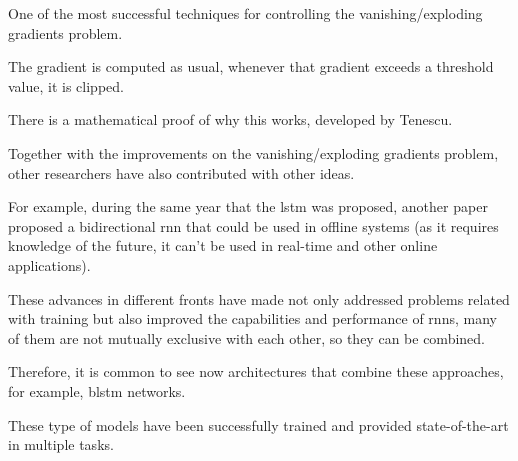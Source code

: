  One of the most successful techniques for
controlling the vanishing/exploding gradients problem.

The gradient is computed as usual, whenever that gradient
exceeds a threshold value, it is clipped.

There is a mathematical proof of why this works, developed
by Tenescu.

 Together with the improvements on
the vanishing/exploding gradients problem, other researchers
have also contributed with other ideas.

For example, during the same year that the \gls{lstm} was
proposed, another paper proposed a bidirectional \gls{rnn}
that could be used in offline systems (as it requires
knowledge of the future, it can’t be used in real-time and
other online applications).

These advances in different fronts have made not only
addressed problems related with training but also improved
the capabilities and performance of \glspl{rnn}, many of
them are not mutually exclusive with each other, so they can
be combined.

Therefore, it is common to see now architectures that
combine these approaches, for example, \gls{blstm} networks.

These type of models have been successfully trained and
provided state-of-the-art in multiple tasks.

